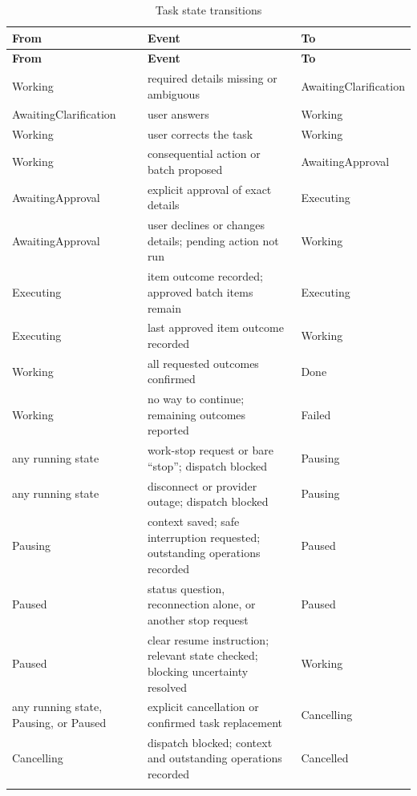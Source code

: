 \documentclass{scrreprt}
\theoremstyle{definition}
\begin{document}
\begingroup
\small
\begin{xltabular}{\textwidth}{>{\raggedright\arraybackslash}p{3.5cm}>{\raggedright\arraybackslash}X>{\raggedright\arraybackslash}p{3.4cm}}
\caption{Task state transitions}\label{tab:fsm}\\
\toprule
\textbf{From} & \textbf{Event} & \textbf{To}\\
\midrule
\endfirsthead
\toprule
\textbf{From} & \textbf{Event} & \textbf{To}\\
\midrule
\endhead
\bottomrule
\endfoot
Working & required details missing or ambiguous & AwaitingClarification\\\addlinespace[4pt]
AwaitingClarification & user answers & Working\\\addlinespace[4pt]
Working & user corrects the task & Working\\\addlinespace[4pt]
Working & consequential action or batch proposed & AwaitingApproval\\\addlinespace[4pt]
AwaitingApproval & explicit approval of exact details & Executing\\\addlinespace[4pt]
AwaitingApproval & user declines or changes details; pending action not run & Working\\\addlinespace[4pt]
Executing & item outcome recorded; approved batch items remain & Executing\\\addlinespace[4pt]
Executing & last approved item outcome recorded & Working\\\addlinespace[4pt]
Working & all requested outcomes confirmed & Done\\\addlinespace[4pt]
Working & no way to continue; remaining outcomes reported & Failed\\\addlinespace[4pt]
any running state & work-stop request or bare ``stop''; dispatch blocked & Pausing\\\addlinespace[4pt]
any running state & disconnect or provider outage; dispatch blocked & Pausing\\\addlinespace[4pt]
Pausing & context saved; safe interruption requested; outstanding operations recorded & Paused\\\addlinespace[4pt]
Paused & status question, reconnection alone, or another stop request & Paused\\\addlinespace[4pt]
Paused & clear resume instruction; relevant state checked; blocking uncertainty resolved & Working\\\addlinespace[4pt]
any running state, Pausing, or Paused & explicit cancellation or confirmed task replacement & Cancelling\\\addlinespace[4pt]
Cancelling & dispatch blocked; context and outstanding operations recorded & Cancelled\\\addlinespace[4pt]
\end{xltabular}
\endgroup
\end{document}
